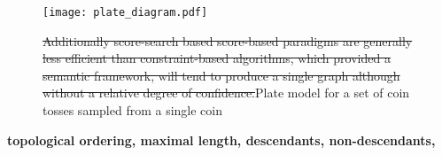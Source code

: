 \documentclass[7pt]{article}
\begin{document}
\begin{figure}
	\centering
	\texttt{[image: plate\_diagram.pdf]}
		\caption{\st{Additionally score-search based score-based  paradigms are generally less efficient than constraint-based algorithms, which provided a semantic framework, will tend to produce a single graph although without a relative degree of confidence.}Plate model for a set of coin tosses sampled from a single coin}
\end{figure}
		



\textbf{topological ordering, maximal length, descendants, non-descendants, }
	
	
	
\end{document}
